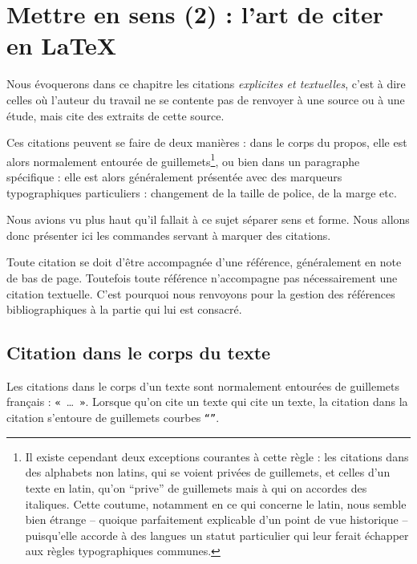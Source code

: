 \chapter{Mettre en sens (2) : l'art de citer en LaTeX}


Nous évoquerons dans ce chapitre les citations \emph{explicites et textuelles}, c'est à dire celles où l'auteur du travail ne se contente pas de renvoyer à une source ou à une étude, mais cite des extraits de cette source.

Ces citations peuvent se faire de deux manières : dans le corps du propos, elle est alors normalement entourée de guillemets\footnote{Il existe cependant deux exceptions courantes à cette règle : les citations dans des alphabets non latins, qui se voient privées de guillemets, et celles d'un texte en latin, qu'on \enquote{prive} de guillemets mais à qui on accordes des italiques. Cette coutume, notamment en ce qui concerne le latin, nous semble bien étrange -- quoique parfaitement explicable d'un point de vue historique -- puisqu'elle accorde à des langues un statut particulier qui leur ferait échapper aux règles typographiques communes.}, ou bien dans un paragraphe spécifique : elle est alors généralement présentée avec des marqueurs typographiques particuliers : changement de la taille de police, de la marge etc.

Nous avions vu plus haut qu'il fallait à ce sujet séparer sens et forme. Nous allons donc présenter ici les commandes servant à marquer des citations.

\begin{attention}
Toute citation se doit d'être accompagnée d'une référence, généralement en note de bas de page. Toutefois toute référence n'accompagne pas nécessairement une citation textuelle. C'est pourquoi nous renvoyons pour la gestion des références bibliographiques à la partie qui lui est consacré.

\end{attention}

\section{Citation dans le corps du texte}

Les citations dans le corps d'un texte sont normalement entourées de guillemets français : \verb|« |\ldots \verb| »|. Lorsque qu'on cite un texte qui cite un texte, la citation dans la citation s'entoure de guillemets courbes \verb|“”|. 


